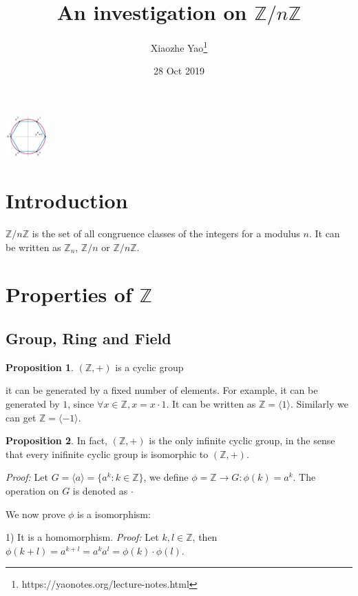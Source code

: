 \documentclass{article}
\title{An investigation on $\mathbb{Z}/n\mathbb{Z}$}
\author{Xiaozhe Yao\footnote{https://yaonotes.org/lecture-notes.html}}
\date{28 Oct 2019}
\theoremstyle{definition}
\newtheorem{proposition}{Proposition}[section]
\begin{document}
\maketitle
\begin{center}
    \includegraphics[width=60px]{Algebra/images/cyclic_group.pdf}
\end{center}
\section{Introduction}
$\mathbb{Z}/n\mathbb{Z}$ is the set of all congruence classes of the integers for a modulus $n$. It can be written as $\mathbb{Z}_n$, $\mathbb{Z}/n$ or $\mathbb{Z}/n\mathbb{Z}$. 

\section{Properties of $\mathbb{Z}$}

\subsection{Group, Ring and Field}

\begin{proposition}
$(\mathbb{Z},+)$ is a cyclic group
\end{proposition}

it can be generated by a fixed number of elements. For example, it can be generated by $1$, since $\forall x \in \mathbb{Z}, x = x \cdot 1$. It can be written as $\mathbb{Z}=\langle1\rangle$. Similarly we can get $\mathbb{Z}=\langle-1\rangle$. 

\begin{proposition}
In fact, $(\mathbb{Z},+)$ is the only infinite cyclic group, in the sense that every inifinite cyclic group is isomorphic to $(\mathbb{Z},+)$.
\end{proposition}

\textit{Proof:} Let $G=\langle a \rangle = \{a^k: k \in \mathbb{Z}\}$, we define $\phi = \mathbb{Z} \to G: \phi(k)=a^k$. The operation on $G$ is denoted as $\cdot$

We now prove $\phi$ is a isomorphism:

1) It is a homomorphism. \textit{Proof:} Let $k,l \in \mathbb{Z}$, then $\phi(k+l)=a^{k+l}=a^ka^l = \phi(k) \cdot \phi(l)$.
\end{document}
